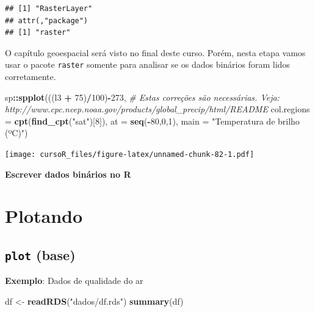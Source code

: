 \documentclass[]{book}
\newenvironment{Shaded}{\begin{snugshade}}{\end{snugshade}}
\newcommand{\KeywordTok}[1]{\textcolor[rgb]{0.13,0.29,0.53}{\textbf{#1}}}
\newcommand{\DataTypeTok}[1]{\textcolor[rgb]{0.13,0.29,0.53}{#1}}
\newcommand{\DecValTok}[1]{\textcolor[rgb]{0.00,0.00,0.81}{#1}}
\newcommand{\StringTok}[1]{\textcolor[rgb]{0.31,0.60,0.02}{#1}}
\newcommand{\CommentTok}[1]{\textcolor[rgb]{0.56,0.35,0.01}{\textit{#1}}}
\newcommand{\OperatorTok}[1]{\textcolor[rgb]{0.81,0.36,0.00}{\textbf{#1}}}
\newcommand{\NormalTok}[1]{#1}
\theoremstyle{definition}
\theoremstyle{definition}
\theoremstyle{definition}
\theoremstyle{remark}
\begin{document}
\begin{verbatim}
## [1] "RasterLayer"
## attr(,"package")
## [1] "raster"
\end{verbatim}

O capítulo geoespacial será visto no final deste curso. Porém, nesta
etapa vamos usar o pacote \texttt{raster} somente para analisar se os
dados binários foram lidos corretamente.

\begin{Shaded}
\begin{Highlighting}[]
\NormalTok{sp}\OperatorTok{::}\KeywordTok{spplot}\NormalTok{(((l3 }\OperatorTok{+}\StringTok{ }\DecValTok{75}\NormalTok{)}\OperatorTok{/}\DecValTok{100}\NormalTok{)}\OperatorTok{-}\DecValTok{273}\NormalTok{, }\CommentTok{# Estas correções são necessárias. Veja: http://www.cpc.ncep.noaa.gov/products/global_precip/html/README}
           \DataTypeTok{col.regions =} \KeywordTok{cpt}\NormalTok{(}\KeywordTok{find_cpt}\NormalTok{(}\StringTok{"sat"}\NormalTok{)[}\DecValTok{8}\NormalTok{]),}
           \DataTypeTok{at =} \KeywordTok{seq}\NormalTok{(}\OperatorTok{-}\DecValTok{80}\NormalTok{,}\DecValTok{0}\NormalTok{,}\DecValTok{1}\NormalTok{),}
           \DataTypeTok{main =} \StringTok{"Temperatura de brilho (ºC)"}\NormalTok{) }
\end{Highlighting}
\end{Shaded}

\texttt{[image: cursoR\_files/figure-latex/unnamed-chunk-82-1.pdf]}

\textbf{Escrever dados binários no R}

\chapter{Plotando}\label{plotando}

\section{\texorpdfstring{\texttt{plot}
(base)}{plot (base)}}\label{plot-base}

\textbf{Exemplo}: Dados de qualidade do ar

\begin{Shaded}
\begin{Highlighting}[]
\NormalTok{df <-}\StringTok{ }\KeywordTok{readRDS}\NormalTok{(}\StringTok{"dados/df.rds"}\NormalTok{)}
\KeywordTok{summary}\NormalTok{(df)}
\end{Highlighting}
\end{Shaded}
\end{document}
